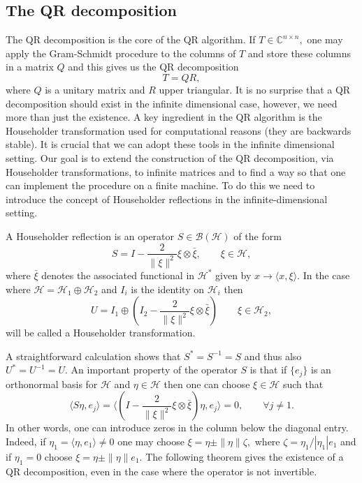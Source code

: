 \documentclass[a4paper,10pt]{article}
\begin{document}
\subsection{The QR decomposition} 
The QR decomposition is the core of the QR algorithm. If $T \in
\mathbb{C}^{n\times n},$ one may apply the Gram-Schmidt procedure
to the columns of $T$ and store these columns in a matrix $Q$ and this
gives us the QR decomposition
\begin{equation}\label{decom}
T = QR,
\end{equation} 
where $Q$ is a unitary matrix and $R$ upper triangular. It is no surprise that a QR decomposition should exist in the infinite dimensional case, however, we need more than just the existence. A key ingredient in the QR algorithm is the Householder transformation used for computational reasons (they are backwards stable). It is crucial that we can adopt these tools in the infinite dimensional setting. Our goal is to extend the construction of the QR decomposition, via Householder transformations, to infinite matrices and to find a way so that one can implement the procedure on a finite machine. To do this we need to introduce the concept of Householder reflections in the infinite-dimensional setting. 
\begin{definition}
A Householder reflection is an operator 
$S \in \mathcal{B}(\mathcal{H})$ of the form 
\begin{equation}\label{theS}
S = I - \frac{2}{\|\xi\|^2} \xi\otimes \bar \xi, \qquad  \xi \in
\mathcal{H},
\end{equation}
where $\bar \xi$ denotes the associated functional in $\mathcal{H}^*$ given by $x\rightarrow\langle x,\xi \rangle$. In the case where $\mathcal{H} = \mathcal{H}_1 \oplus \mathcal{H}_2$
and 
$I_i$ is the identity on $\mathcal{H}_i$ then 
\[
U = I_1 \oplus \left(I_2 - \frac{2}{\|\xi\|^2} \xi\otimes \bar \xi
\right) \qquad  \xi \in 
\mathcal{H}_2,  
\] 
will be called a Householder transformation. 
\end{definition}
A straightforward calculation shows that $S^* = S^{-1} = S$ and thus
also 
$U^* = U^{-1} = U.$
An important property of the operator $S$ is that if $\{e_j\}$ is 
an orthonormal basis for $\mathcal{H}$ and $\eta \in
\mathcal{H}$ then one can
choose $\xi \in \mathcal{H}$ such that 
\[
\langle S\eta, e_j\rangle =  \langle (I - \frac{2}{\|\xi\|^2}
\xi\otimes 
\bar \xi)\eta, e_j\rangle = 0, \qquad \forall j \neq 1.
\]
In other words, one can introduce zeros in the column below the diagonal entry. Indeed, if $\eta_1 = \langle \eta, e_1\rangle \neq 0$ one may
choose 
$\xi = \eta \pm \|\eta\|\zeta,$
where 
$\zeta =
\eta_1/|\eta_1|e_1$ and if $\eta_1 = 0$ choose $\xi = \eta \pm \|\eta\|e_1.$ The following theorem gives the existence of a QR decomposition, even in the case where the operator is not invertible.
\end{document}
